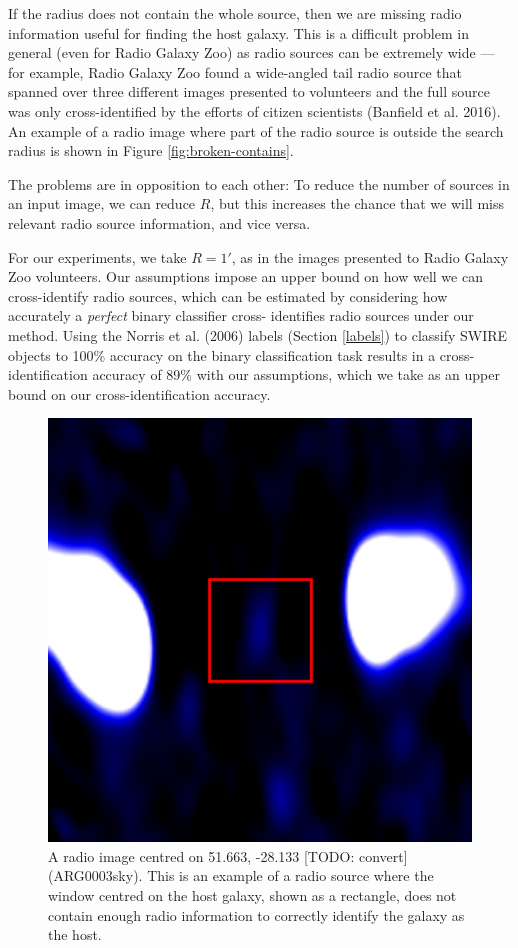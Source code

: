 \documentclass[fleqn,usenatbib,usedcolumn]{mnras}
\begin{document}
    If the radius does not contain the whole source, then we are missing radio
    information useful for finding the host galaxy. This is a difficult
    problem in general (even for Radio Galaxy Zoo) as radio sources can be
    extremely wide --- for example, Radio Galaxy Zoo found a wide-angled tail
    radio source that spanned over three different images presented to
    volunteers and the full source was only cross-identified by the efforts of
    citizen scientists (Banfield et al. 2016). An example of a radio image
    where part of the radio source is outside the search radius is shown in
    Figure \ref{fig:broken-contains}.

    The problems are in opposition to each other: To reduce the number of
    sources in an input image, we can reduce $R$, but this increases the
    chance that we will miss relevant radio source information, and vice
    versa.

    For our experiments, we take $R = 1'$, as in the images presented to
    Radio Galaxy Zoo volunteers. Our assumptions impose an upper bound on how
    well we can cross-identify radio sources, which can be estimated by
    considering how accurately a \emph{perfect} binary classifier cross-
    identifies radio sources under our method. Using the Norris et al. (2006)
    labels (Section \ref{labels}) to classify SWIRE objects to 100\% accuracy
    on the binary classification task results in a cross-identification
    accuracy of 89\% with our assumptions, which we take as an upper bound on
    our cross-identification accuracy.

    \begin{figure}
      \centering
      \includegraphics[width=0.5\linewidth]{images/ARG0003sky_radio.eps}
      \caption{A radio image centred on 51.663, -28.133 [TODO: convert]
        (ARG0003sky). This is an example of a radio source where the window
        centred on the host galaxy, shown as a rectangle, does not contain
        enough radio information to correctly identify the galaxy as the
        host.}
      \label{fig:broken-window-size}
    \end{figure}
\end{document}
